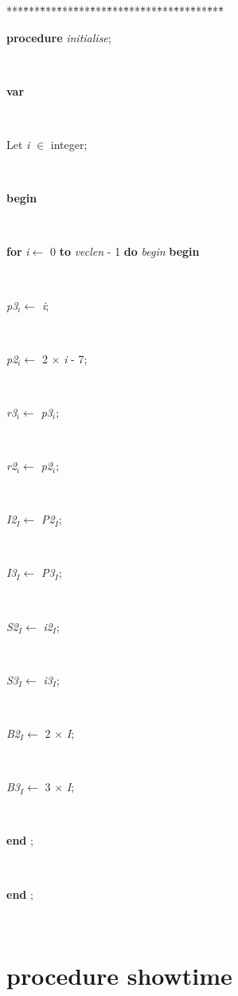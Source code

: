 \documentclass[10pt, a4paper]{article}
\begin{document}
\begin{tabbing}
***\=***\=***\=***\=***\=***\=***\=***\=***\=***\=***\=***\=***\=\kill
\parbox{14cm}{\textsf {\textbf {procedure } \textsf{\textit{initialise}}; }}\\
\+\parbox{14cm}{\textsf{\textbf{var} }}\\
\parbox{14cm}{\textsf{Let \textit{i} $\in$ integer;}}\\
\-\<\+\parbox{14cm}{\textsf{\textbf{begin} }}\\
\+\<\parbox{14cm}{\textsf {\textbf {for } \textsf{\textit{i}$\leftarrow$ 0} \textbf{ to } \textsf{\textit{veclen} - 1} \textbf{ do } \textsf{\textit{begin}} \textbf{ begin } }}\\
\parbox{14cm}{\textsf{\textit{p3}$_{\textit{i}}$$\leftarrow$ \textit{i}}; }\\
\parbox{14cm}{\textsf{\textit{p2}$_{\textit{i}}$$\leftarrow$ 2 $\times$ \textit{i} - 7}; }\\
\parbox{14cm}{\textsf{\textit{r3}$_{\textit{i}}$$\leftarrow$ \textit{p3}$_{\textit{i}}$}; }\\
\parbox{14cm}{\textsf{\textit{r2}$_{\textit{i}}$$\leftarrow$ \textit{p2}$_{\textit{i}}$}; }\\
\parbox{14cm}{\textsf{\textit{I2}$_{\textit{I}}$$\leftarrow$ \textit{P2}$_{\textit{I}}$}; }\\
\parbox{14cm}{\textsf{\textit{I3}$_{\textit{I}}$$\leftarrow$ \textit{P3}$_{\textit{I}}$}; }\\
\parbox{14cm}{\textsf{\textit{S2}$_{\textit{I}}$$\leftarrow$ \textit{i2}$_{\textit{I}}$}; }\\
\parbox{14cm}{\textsf{\textit{S3}$_{\textit{I}}$$\leftarrow$ \textit{i3}$_{\textit{I}}$}; }\\
\parbox{14cm}{\textsf{\textit{B2}$_{\textit{I}}$$\leftarrow$ 2 $\times$ \textit{I}}; }\\
\parbox{14cm}{\textsf{\textit{B3}$_{\textit{I}}$$\leftarrow$ 3 $\times$ \textit{I}}; }\\
\<\-\parbox{14cm}{\textsf{\textbf{end} ;}}\\
\<\-\parbox{14cm}{\textsf{\textbf{end} ;}}\\
\end{tabbing}
\section{procedure showtime}\label{sec:vectest/dovectestshowtime}
\end{document}
